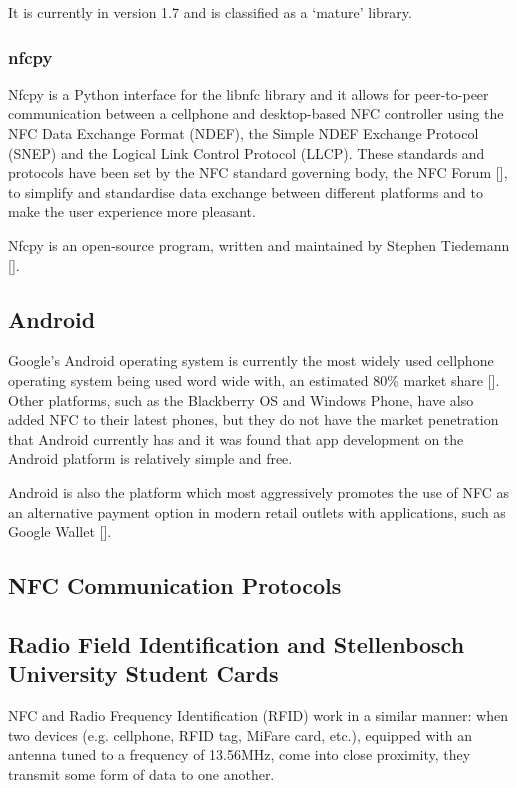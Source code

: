 It is currently in version 1.7 and is classified as a `mature' library. 

\subsubsection{nfcpy}

Nfcpy is a Python interface for the libnfc library and it allows for peer-to-peer communication
between a cellphone and desktop-based NFC controller using the NFC Data Exchange Format
(NDEF), the Simple NDEF Exchange Protocol (SNEP) and the Logical Link Control Protocol (LLCP).
These standards and protocols have been set by the NFC standard governing body, the NFC Forum
[\cite{website:nfc-forum}], to simplify and standardise data exchange between different
platforms and to make the user experience more pleasant.

Nfcpy is an open-source program, written and maintained by Stephen Tiedemann
[\cite{website:nfcpy}].

\subsection{Android}

Google's Android operating system is currently the most widely used cellphone operating system
being used word wide with, an estimated 80\% market share [\cite{article:android-marketshare}].
Other platforms, such as the Blackberry OS and Windows Phone, have also added NFC to their
latest phones, but they do not have the market penetration that Android currently has and it
was found that app development on the Android platform is relatively simple and free. 

Android is also the platform which most aggressively promotes the use of NFC as an alternative 
payment option in modern retail outlets with applications, such as Google Wallet
[\cite{article:android-wallet}].

\subsection{NFC Communication Protocols}

\subsection{Radio Field Identification and Stellenbosch
University Student Cards}

NFC and Radio Frequency Identification (RFID) work in a similar manner: when two
devices  (e.g. cellphone, RFID tag, MiFare card, etc.), equipped with an antenna tuned to a
frequency  of 13.56MHz, come into close proximity, they transmit some form of data to one another.

